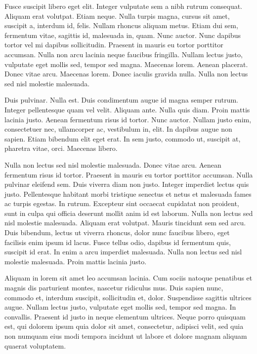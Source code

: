 Fusce suscipit libero eget elit. Integer vulputate sem a nibh rutrum consequat. Aliquam erat volutpat. Etiam neque. Nulla turpis magna, cursus sit amet, suscipit a, interdum id, felis. Nullam rhoncus aliquam metus. Etiam dui sem, fermentum vitae, sagittis id, malesuada in, quam. Nunc auctor. Nunc dapibus tortor vel mi dapibus sollicitudin. Praesent in mauris eu tortor porttitor accumsan. Nulla non arcu lacinia neque faucibus fringilla. Nullam lectus justo, vulputate eget mollis sed, tempor sed magna. Maecenas lorem. Aenean placerat. Donec vitae arcu. Maecenas lorem. Donec iaculis gravida nulla. Nulla non lectus sed nisl molestie malesuada.

Duis pulvinar. Nulla est. Duis condimentum augue id magna semper rutrum. Integer pellentesque quam vel velit. Aliquam ante. Nulla quis diam. Proin mattis lacinia justo. Aenean fermentum risus id tortor. Nunc auctor. Nullam justo enim, consectetuer nec, ullamcorper ac, vestibulum in, elit. In dapibus augue non sapien. Etiam bibendum elit eget erat. In sem justo, commodo ut, suscipit at, pharetra vitae, orci. Maecenas libero.

Nulla non lectus sed nisl molestie malesuada. Donec vitae arcu. Aenean fermentum risus id tortor. Praesent in mauris eu tortor porttitor accumsan. Nulla pulvinar eleifend sem. Duis viverra diam non justo. Integer imperdiet lectus quis justo. Pellentesque habitant morbi tristique senectus et netus et malesuada fames ac turpis egestas. In rutrum. Excepteur sint occaecat cupidatat non proident, sunt in culpa qui officia deserunt mollit anim id est laborum. Nulla non lectus sed nisl molestie malesuada. Aliquam erat volutpat. Mauris tincidunt sem sed arcu. Duis bibendum, lectus ut viverra rhoncus, dolor nunc faucibus libero, eget facilisis enim ipsum id lacus. Fusce tellus odio, dapibus id fermentum quis, suscipit id erat. In enim a arcu imperdiet malesuada. Nulla non lectus sed nisl molestie malesuada. Proin mattis lacinia justo.

Aliquam in lorem sit amet leo accumsan lacinia. Cum sociis natoque penatibus et magnis dis parturient montes, nascetur ridiculus mus. Duis sapien nunc, commodo et, interdum suscipit, sollicitudin et, dolor. Suspendisse sagittis ultrices augue. Nullam lectus justo, vulputate eget mollis sed, tempor sed magna. In convallis. Praesent id justo in neque elementum ultrices. Neque porro quisquam est, qui dolorem ipsum quia dolor sit amet, consectetur, adipisci velit, sed quia non numquam eius modi tempora incidunt ut labore et dolore magnam aliquam quaerat voluptatem.

